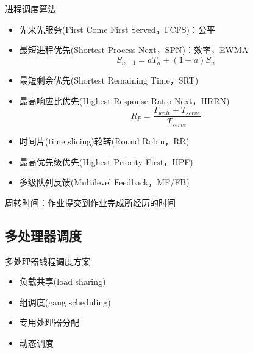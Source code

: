 进程调度算法
\begin{itemize}
\item 先来先服务(First Come First Served，FCFS)：公平
\item 最短进程优先(Shortest Process Next，SPN)：效率，EWMA
\[S_{n+1}=aT_n+(1-a)S_n\]
\item 最短剩余优先(Shortest Remaining Time，SRT)
\item 最高响应比优先(Highest Response Ratio Next，HRRN)
\[R_P=\frac{T_{wait}+T_{serve}}{T_{serve}}\]
\item 时间片(time slicing)轮转(Round Robin，RR)
\item 最高优先级优先(Highest Priority First，HPF)
\item 多级队列反馈(Multilevel Feedback，MF/FB)
\end{itemize}

周转时间：作业提交到作业完成所经历的时间

\subsection{多处理器调度}
多处理器线程调度方案
\begin{itemize}
    \item 负载共享(load sharing)
    \item 组调度(gang scheduling)
    \item 专用处理器分配
    \item 动态调度
\end{itemize}

